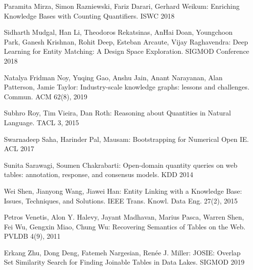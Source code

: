 \documentclass[11pt]{article}
\begin{document}
\begin{thebibliography}{99}
 Paramita Mirza, Simon Razniewski, Fariz Darari, Gerhard Weikum:
Enriching Knowledge Bases with Counting Quantifiers. 
ISWC 2018


 Sidharth Mudgal, Han Li, Theodoros Rekatsinas, AnHai Doan, Youngchoon Park, Ganesh Krishnan, Rohit Deep, Esteban Arcaute, Vijay Raghavendra:
Deep Learning for Entity Matching: A Design Space Exploration. SIGMOD Conference 2018


 Natalya Fridman Noy, Yuqing Gao, Anshu Jain, Anant Narayanan, Alan Patterson, Jamie Taylor:
Industry-scale knowledge graphs: lessons and challenges. Commun. ACM 62(8), 2019


 Subhro Roy, Tim Vieira, Dan Roth:
Reasoning about Quantities in Natural Language. TACL 3, 2015


 Swarnadeep Saha, Harinder Pal, Mausam:
Bootstrapping for Numerical Open IE. ACL 2017

 Sunita Sarawagi, Soumen Chakrabarti:
Open-domain quantity queries on web tables: annotation, response, and consensus models. KDD 2014

 Wei Shen, Jianyong Wang, Jiawei Han:
Entity Linking with a Knowledge Base: Issues, Techniques, and Solutions. IEEE Trans. Knowl. Data Eng. 27(2),
2015

 Petros Venetis, Alon Y. Halevy, Jayant Madhavan, Marius Pasca, Warren Shen, Fei Wu, Gengxin Miao, Chung Wu:
Recovering Semantics of Tables on the Web. PVLDB 4(9), 2011

 Erkang Zhu, Dong Deng, Fatemeh Nargesian, Renée J. Miller:
JOSIE: Overlap Set Similarity Search for Finding Joinable Tables in Data Lakes. SIGMOD 2019










\end{thebibliography}
\end{document}
